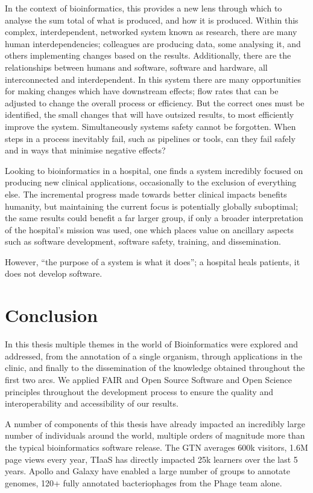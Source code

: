 In the context of bioinformatics, this provides a new lens through which to analyse the sum total of what is produced, and how it is produced. Within this complex, interdependent, networked system known as research, there are many human interdependencies; colleagues are producing data, some analysing it, and others implementing changes based on the results. Additionally, there are the relationships between humans and software, software and hardware, all interconnected and interdependent. In this system there are many opportunities for making changes which have downstream effects; flow rates that can be adjusted to change the overall process or efficiency. But the correct ones must be identified, the small changes that will have outsized results, to most efficiently improve the system. Simultaneously systems safety cannot be forgotten. When steps in a process inevitably fail, such as pipelines or tools, can they fail safely and in ways that minimise negative effects?

Looking to bioinformatics in a hospital, one finds a system incredibly focused on producing new clinical applications, occasionally to the exclusion of everything else. The incremental progress made towards better clinical impacts benefits humanity, but maintaining the current focus is potentially globally suboptimal; the same results could benefit a far larger group, if only a broader interpretation of the hospital's mission was used, one which places value on ancillary aspects such as software development, software safety, training, and dissemination.

However, ``the purpose of a system is what it does''; a hospital heals patients, it does not develop software.

\section{Conclusion}

In this thesis multiple themes in the world of Bioinformatics were explored and addressed, from the annotation of a single organism, through applications in the clinic, and finally to the dissemination of the knowledge obtained throughout the first two arcs. We applied FAIR and Open Source Software and Open Science principles throughout the development process to ensure the quality and interoperability and accessibility of our results.

A number of components of this thesis have already impacted an incredibly large number of individuals around the world, multiple orders of magnitude more than the typical bioinformatics software release. The GTN averages 600k visitors, 1.6M page views every year\cite{GtnStats}, TIaaS has directly impacted 25k learners over the last 5 years. Apollo and Galaxy have enabled a large number of groups to annotate genomes, 120+ fully annotated bacteriophages from the Phage team alone\cite{Bioproj}.

